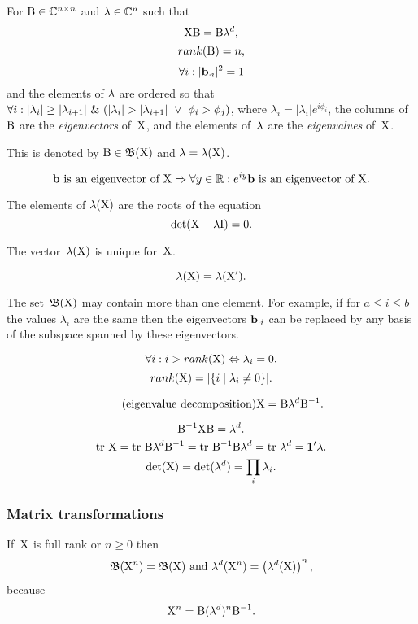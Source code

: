 \documentclass[10pt,a4paper]{article}
\theoremstyle{plain} \newtheorem{Lem}{Lemma}
\begin{document}
{
For $\mathrm B \in \mathbb C^{n \times n}$ and $\mathbf \lambda \in \mathbb C^n$
such that 
$$\mathrm X \mathrm B = \mathrm B \mathbf \lambda^d,$$
$$ rank(\mathrm B) = n, $$
$$ \forall i: |\mathbf b_{\cdot i}|^2 = 1 $$
and the elements of $\mathbf \lambda$ are ordered so that $\forall i : |\lambda_i| \ge |\lambda_{i+1}| \ \& \  (|\lambda_i| > |\lambda_{i+1}| \ \vee \  \phi_i > \phi_j)$, where $\lambda_i = |\lambda_i| e^{i \phi_i}$,
the columns of~$\mathrm B$ are the {\em eigenvectors} of~$\mathrm X$,
and the elements of~$\mathbf \lambda$ are the {\em eigenvalues} of~$\mathrm X$.

This is denoted by $\mathrm B \in \mathfrak B(\mathrm X)$ and $\mathbf \lambda = \mathbf \lambda(\mathrm X)$.
}

$$ \mathbf b \text{ is an eigenvector of } \mathrm X \Rightarrow \forall y \in \mathbb R : e^{i y} \mathbf b \text{ is an eigenvector of } \mathrm X. $$

The elements of $\mathbf \lambda(\mathrm X)$ are the roots of the equation
$$ \det(\mathrm X - \lambda \mathrm I) = 0. $$

The vector~$\mathbf \lambda(\mathrm X)$ is unique for~$\mathrm X$.

$$ \mathbf \lambda(\mathrm X) = \mathbf \lambda(\mathrm X'). $$

The set~$\mathfrak B(\mathrm X)$ may contain more than one element.
For example, if for $a \le i \le b$ the values $\lambda_i$ are the same 
then the eigenvectors $\mathbf b_{\cdot i}$ can be replaced by any basis of the subspace spanned by these eigenvectors.

$$ \forall i: i > rank(\mathrm X) \Leftrightarrow \lambda_i = 0. $$
$$ rank(\mathrm X) = |\{i \mid \lambda_i \ne 0\}|. $$

\begin{equation} \label{mat2eigen} \tag{eigenvalue decomposition}
  \mathrm X = \mathrm B \mathbf \lambda^d \mathrm B^{-1}. 
\end{equation}

$$ \mathrm B^{-1} \mathrm X \mathrm B = \mathbf \lambda^d. $$
$$ \mathrm {tr} \  \mathrm X = \mathrm {tr} \  \mathrm B \mathbf \lambda^d \mathrm B^{-1} = \mathrm {tr} \  \mathrm B^{-1} \mathrm B \mathbf \lambda^d = \mathrm {tr} \  \mathbf \lambda^d = \mathbf 1' \mathbf \lambda. $$
$$ \det(\mathrm X) = \det(\mathbf \lambda^d) = \prod_i \lambda_i. $$


\subsubsection {Matrix transformations}
If~$\mathrm X$ is full rank or $n \ge 0$ then
$$ \mathfrak B(\mathrm X^n)  = \mathfrak B(\mathrm X) \text{ and } \mathbf \lambda^d(\mathrm X^n) = \left(\mathbf \lambda^d(\mathrm X) \right)^n, $$
because
$$ \mathrm X^n = \mathrm B (\mathbf \lambda^d)^n \mathrm B^{-1}. $$
\end{document}
